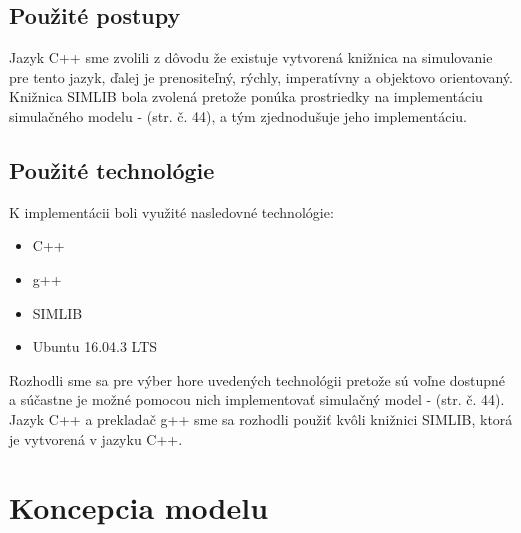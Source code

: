 \documentclass[11pt,a4paper]{article}
\begin{document}
    \subsection{Použité postupy}

        Jazyk C++ sme zvolili z dôvodu že existuje vytvorená knižnica na simulovanie pre tento jazyk, ďalej je prenositeľný, rýchly, imperatívny a objektovo orientovaný. Knižnica SIMLIB bola zvolená pretože ponúka prostriedky na implementáciu simulačného modelu - \cite{IMS}(str. č. 44), a tým zjednodušuje jeho implementáciu.

    \subsection{Použité technológie}

        \noindent K implementácii boli využité nasledovné technológie:
        \begin{itemize}
            \item C++ {}
            \item g++ {}
            \item SIMLIB {}
            \item Ubuntu 16.04.3 LTS {}
        \end{itemize}

        \indent Rozhodli sme sa pre výber hore uvedených technológii pretože sú voľne dostupné a súčastne je možné pomocou nich implementovať simulačný model - \cite{IMS}(str. č. 44). Jazyk C++ a prekladač g++ sme sa rozhodli použiť kvôli knižnici SIMLIB, ktorá je vytvorená v jazyku C++.

\section{Koncepcia modelu}
\end{document}
